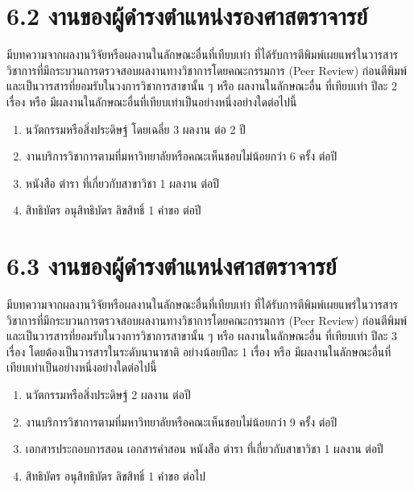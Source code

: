 \documentclass[a4paper,12pt,english]{sphinxmanual}
\begin{document}
\section{6.2 งานของผู้ดำรงตำแหน่งรองศาสตราจารย์}
\label{\detokenize{6academicposition:id5}}
มีบทความจากผลงานวิจัยหรือผลงานในลักษณะอื่นที่เทียบเท่า ที่ได้รับการตีพิมพ์เผยแพร่ในวารสารวิชาการที่มีกระบวนการตรวจสอบผลงานทางวิชาการโดยคณะกรรมการ (Peer Review) ก่อนตีพิมพ์ และเป็นวารสารที่ยอมรับในวงการวิชาการสาขานั้น ๆ หรือ ผลงานในลักษณะอื่น ที่เทียบเท่า ปีละ 2 เรื่อง หรือ มีผลงานในลักษณะอื่นที่เทียบเท่าเป็นอย่างหนึ่งอย่างใดต่อไปนี้
\begin{enumerate}
%
\item {} 
นวัตกรรมหรือสิ่งประดิษฐ์ โดยเฉลี่ย 3 ผลงาน ต่อ 2 ปี

\item {} 
งานบริการวิชาการตามที่มหาวิทยาลัยหรือคณะเห็นชอบไม่น้อยกว่า 6 ครั้ง ต่อปี

\item {} 
หนังสือ ตำรา ที่เกี่ยวกับสาขาวิชา 1 ผลงาน ต่อปี

\item {} 
สิทธิบัตร อนุสิทธิบัตร ลิขสิทธิ์ 1 คำขอ ต่อปี

\end{enumerate}


\section{6.3 งานของผู้ดำรงตำแหน่งศาสตราจารย์}
\label{\detokenize{6academicposition:id6}}
มีบทความจากผลงานวิจัยหรือผลงานในลักษณะอื่นที่เทียบเท่า ที่ได้รับการตีพิมพ์เผยแพร่ในวารสารวิชาการที่มีกระบวนการตรวจสอบผลงานทางวิชาการโดยคณะกรรมการ (Peer Review) ก่อนตีพิมพ์ และเป็นวารสารที่ยอมรับในวงการวิชาการสาขานั้น ๆ หรือ ผลงานในลักษณะอื่น ที่เทียบเท่า ปีละ 3 เรื่อง โดยต้องเป็นวารสารในระดับนานาชาติ อย่างน้อยปีละ 1 เรื่อง หรือ มีผลงานในลักษณะอื่นที่เทียบเท่าเป็นอย่างหนึ่งอย่างใดต่อไปนี้
\begin{enumerate}
%
\item {} 
นวัตกรรมหรือสิ่งประดิษฐ์ 2 ผลงาน ต่อปี

\item {} 
งานบริการวิชาการตามที่มหาวิทยาลัยหรือคณะเห็นชอบไม่น้อยกว่า 9 ครั้ง ต่อปี

\item {} 
เอกสารประกอบการสอน เอกสารคำสอน หนังสือ ตำรา ที่เกี่ยวกับสาขาวิชา 1 ผลงาน ต่อปี

\item {} 
สิทธิบัตร อนุสิทธิบัตร ลิขสิทธิ์ 1 คำขอ ต่อไป

\end{enumerate}
\end{document}
